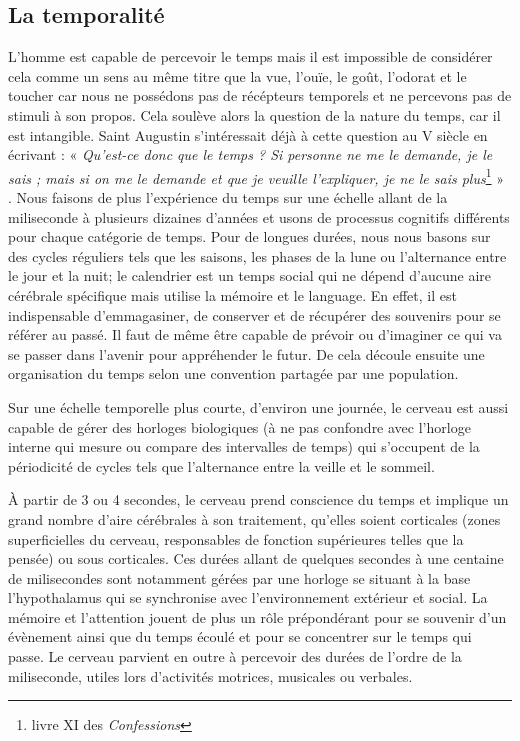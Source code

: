 \documentclass[12pt,fleqn,oneside,openany]{book} %
\begin{document}
\subsection[La temporalité]{La temporalité \cite{reptemps,basePerception,perceptionTemps,tempsEtIllusions}} \label{ssec:temporalite} %

L'homme est capable de percevoir le temps mais il est impossible de considérer cela comme un sens au même titre que la vue, l'ouïe, le goût, l'odorat et le toucher car nous ne possédons pas de récépteurs temporels et ne percevons pas de stimuli à son propos. Cela soulève alors la question de la nature du temps, car il est intangible. Saint Augustin s'intéressait déjà à cette question au V siècle en écrivant : « \emph{Qu’est-ce donc que le temps ? Si personne ne me le demande, je le sais ; mais si on me le demande et que je veuille l’expliquer, je ne le sais plus}\footnote{livre XI des \emph{Confessions}} » \cite{augustin}. Nous faisons de plus l'expérience du temps sur une échelle allant de la miliseconde à plusieurs dizaines d'années et usons de processus cognitifs différents pour chaque catégorie de temps. Pour de longues durées, nous nous basons sur des cycles réguliers tels que les saisons, les phases de la lune ou l'alternance entre le jour et la nuit; le calendrier est un temps social qui ne dépend d'aucune aire cérébrale spécifique mais utilise la mémoire et le language. En effet, il est indispensable d'emmagasiner, de conserver et de récupérer des souvenirs pour se référer au passé. Il faut de même être capable de prévoir ou d'imaginer ce qui va se passer dans l'avenir pour appréhender le futur. De cela découle ensuite une organisation du temps selon une convention partagée par une population.

Sur une échelle temporelle plus courte, d'environ une journée, le cerveau est aussi capable de gérer des horloges biologiques (à ne pas confondre avec l'horloge interne qui mesure ou compare des intervalles de temps) qui s'occupent de la périodicité de cycles tels que l'alternance entre la veille et le sommeil. 

À partir de 3 ou 4 secondes, le cerveau prend conscience du temps et implique un grand nombre d'aire cérébrales à son traitement, qu'elles soient corticales (zones superficielles du cerveau, responsables de fonction supérieures telles que la pensée) ou sous corticales. Ces durées allant de quelques secondes à une centaine de milisecondes sont notamment gérées par une horloge se situant à la base l'hypothalamus qui se synchronise avec l'environnement extérieur et social. La mémoire et l'attention jouent de plus un rôle prépondérant pour se souvenir d'un évènement ainsi que du temps écoulé et pour se concentrer sur le temps qui passe. Le cerveau parvient en outre à percevoir des durées de l'ordre de la miliseconde, utiles lors d'activités motrices, musicales ou verbales.
\end{document}
